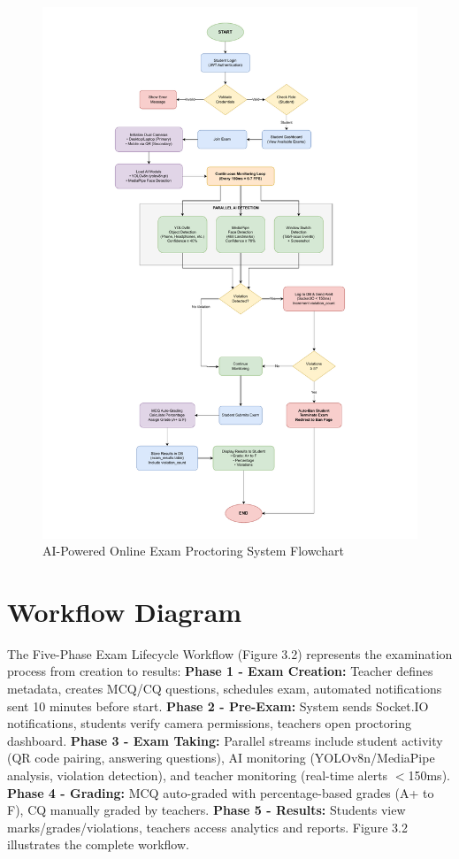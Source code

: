 \begin{figure}[ht]
    \centering
    \includegraphics[width=\textwidth]{Chap3/flowchart}
    \caption{AI-Powered Online Exam Proctoring System Flowchart}
    \label{fig:flowchart}
\end{figure}

\section{Workflow Diagram}

The Five-Phase Exam Lifecycle Workflow (Figure 3.2) represents the examination process from creation to results: \textbf{Phase 1 - Exam Creation:} Teacher defines metadata, creates MCQ/CQ questions, schedules exam, automated notifications sent 10 minutes before start. \textbf{Phase 2 - Pre-Exam:} System sends Socket.IO notifications, students verify camera permissions, teachers open proctoring dashboard. \textbf{Phase 3 - Exam Taking:} Parallel streams include student activity (QR code pairing, answering questions), AI monitoring (YOLOv8n/MediaPipe analysis, violation detection), and teacher monitoring (real-time alerts $<$150ms). \textbf{Phase 4 - Grading:} MCQ auto-graded with percentage-based grades (A+ to F), CQ manually graded by teachers. \textbf{Phase 5 - Results:} Students view marks/grades/violations, teachers access analytics and reports. Figure 3.2 illustrates the complete workflow.

